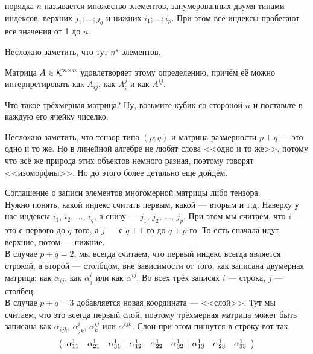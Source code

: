 \documentclass{article}
\begin{document}
\begin{itemize}
        \dfn {} порядка $n$ называется множество элементов, занумерованных двумя типами индексов: верхних $j_1;\ldots;j_q$ и нижних $i_1;\ldots;i_p$. При этом все индексы пробегают все значения от 1 до $n$.
        \begin{Comment}
            Несложно заметить, что тут $n^s$ элементов.
        \end{Comment}
        \begin{Example}
            Матрица $A\in\scriptK^{n\times n}$ удовлетворяет этому определению, причём её можно интерпретировать как $A_{ij}$, как $A^j_i$ и как $A^{ij}$.
        \end{Example}
        \begin{Example}
            Что такое трёхмерная матрица? Ну, возьмите кубик со стороной $n$ и поставьте в каждую его ячейку чиселко.
        \end{Example}
        \begin{Comment}
            Несложно заметить, что тензор типа $(p;q)$ и матрица размерности $p+q$ --- это одно и то же. Но в линейной алгебре не любят слова <<одно и то же>>, потому что всё же природа этих объектов немного разная, поэтому говорят <<изоморфны>>. Но до этого более детально ещё дойдём.
        \end{Comment}
        \begin{Comment}
            Соглашение о записи элементов многомерной матрицы либо тензора.\\
            Нужно понять, какой индекс считать первым, какой --- вторым и т.д. Наверху у нас индексы $i_1$, $i_2$, ..., $i_q$, а снизу --- $j_1$, $j_2$, ..., $j_p$. При этом мы считаем, что $i$ --- это с первого до $q$-того, а $j$ --- с $q+1$-го до $q+p$-го. То есть сначала идут верхние, потом --- нижние.\\
            В случае $p+q=2$, мы всегда считаем, что первый индекс всегда является строкой, а второй --- столбцом, вне зависимости от того, как записана двумерная матрица: как $\alpha_{ij}$, как $\alpha^i_j$ или как $\alpha^{ij}$. Во всех трёх записях $i$ --- строка, $j$ --- столбец.\\
            В случае $p+q=3$ добавляется новая координата --- <<слой>>. Тут мы считаем, что это всегда первый слой, поэтому трёхмерная матрица может быть записана как $\alpha_{ijk}$, $\alpha^i_{jk}$, $\alpha^{ij}_k$ или $\alpha^{ijk}$. Слои при этом пишутся в строку вот так:
            $$
            \arr{ccc|ccc|ccc}{
                \alpha^1_{11} & \alpha^1_{21} & \alpha^1_{31} & \alpha^1_{12} & \alpha^1_{22} & \alpha^1_{32} & \alpha^1_{13} & \alpha^1_{23} & \alpha^1_{33}\\
}$$
\end{Comment}
\end{itemize}
\end{document}
